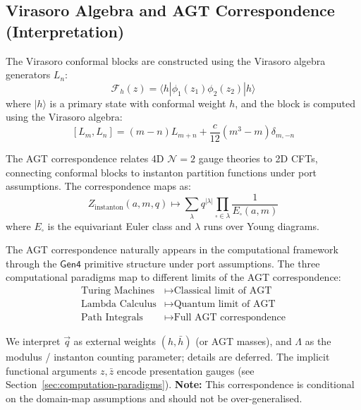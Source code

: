 \subsection{Virasoro Algebra and AGT Correspondence (Interpretation)}

\begin{definition}
\label{def:virasoro-blocks}
The Virasoro conformal blocks are constructed using the Virasoro algebra generators \cite{virasoro1970} $L_n$:
\[
\mathcal{F}_h(z) = \langle h | \phi_1(z_1) \phi_2(z_2) | h \rangle
\]
where $|h\rangle$ is a primary state with conformal weight $h$, and the block is computed using the Virasoro algebra:
\[
[L_m, L_n] = (m-n)L_{m+n} + \frac{c}{12}(m^3-m)\delta_{m,-n}
\]
\end{definition}

\begin{definition}
\label{def:agt-correspondence}
The AGT correspondence relates 4D $\mathcal{N}=2$ gauge theories to 2D CFTs, connecting conformal blocks to instanton partition functions under port assumptions. The correspondence maps as:
\[
Z_{\text{instanton}}(a, m, q) \mapsto \sum_{\lambda} q^{|\lambda|} \prod_{\square \in \lambda} \frac{1}{E_{\square}(a, m)}
\]
where $E_{\square}$ is the equivariant Euler class and $\lambda$ runs over Young diagrams.
\end{definition}

\begin{proposition}
\label{prop:agt-computational-gen4}
The AGT correspondence naturally appears in the computational framework through the $\mathsf{Gen4}$ primitive structure under port assumptions. The three computational paradigms map to different limits of the AGT correspondence:
\begin{align}
\text{Turing Machines} &\mapsto \text{Classical limit of AGT} \\
\text{Lambda Calculus} &\mapsto \text{Quantum limit of AGT} \\
\text{Path Integrals} &\mapsto \text{Full AGT correspondence}
\end{align}

We interpret $\vec{q}$ as external weights $(h,\bar{h})$ (or AGT masses), and $\Lambda$ as the modulus / instanton counting parameter; details are deferred. The implicit functional arguments $z, \bar{z}$ encode presentation gauges (see Section~\ref{sec:computation-paradigms}).
\textbf{Note:} This correspondence is conditional on the domain-map assumptions and should not be over-generalised.
\end{proposition}

